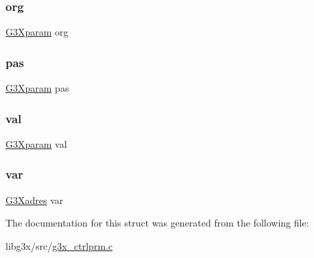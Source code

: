 \mbox{\label{struct_g3_xprm_a47d33e71270284b7a2894e05d2e027f1}} 
\subsubsection{\texorpdfstring{org}{org}}
{\footnotesize\ttfamily \hyperlink{struct_g3_xparam}{G3\+Xparam} org}

\mbox{\label{struct_g3_xprm_ab69882f819bf766798d589ebdcb88810}} 
\subsubsection{\texorpdfstring{pas}{pas}}
{\footnotesize\ttfamily \hyperlink{struct_g3_xparam}{G3\+Xparam} pas}

\mbox{\label{struct_g3_xprm_a4d4fb5e18a33888fe4983e76456c66c9}} 
\subsubsection{\texorpdfstring{val}{val}}
{\footnotesize\ttfamily \hyperlink{struct_g3_xparam}{G3\+Xparam} val}

\mbox{\label{struct_g3_xprm_a354591d125c7cd20f2fcec10cdb15188}} 
\subsubsection{\texorpdfstring{var}{var}}
{\footnotesize\ttfamily \hyperlink{struct_g3_xadres}{G3\+Xadres} var}



The documentation for this struct was generated from the following file\+:\begin{DoxyCompactItemize}
\item 
libg3x/src/\hyperlink{g3x__ctrlprm_8c}{g3x\+\_\+ctrlprm.\+c}\end{DoxyCompactItemize}
